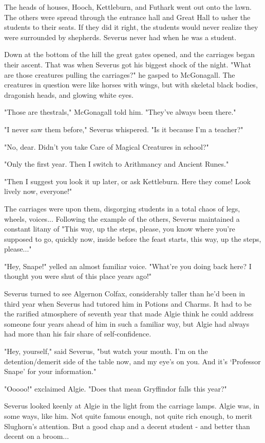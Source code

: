\documentclass[a4paper,11pt]{article}
\begin{document}
The heads of houses, Hooch, Kettleburn, and Futhark went out onto the lawn. The others were spread through the entrance hall and Great Hall to usher the students to their seats. If they did it right, the students would never realize they were surrounded by shepherds. Severus never had when he was a student.

Down at the bottom of the hill the great gates opened, and the carriages began their ascent. That was when Severus got his biggest shock of the night. "What are those creatures pulling the carriages?" he gasped to McGonagall. The creatures in question were like horses with wings, but with skeletal black bodies, dragonish heads, and glowing white eyes.

"Those are thestrals," McGonagall told him. "They've always been there."

"I never saw them before," Severus whispered. "Is it because I'm a teacher?"

"No, dear. Didn't you take Care of Magical Creatures in school?"

"Only the first year. Then I switch to Arithmancy and Ancient Runes."

"Then I suggest you look it up later, or ask Kettleburn. Here they come! Look lively now, everyone!"

The carriages were upon them, disgorging students in a total chaos of legs, wheels, voices... Following the example of the others, Severus maintained a constant litany of "This way, up the steps, please, you know where you're supposed to go, quickly now, inside before the feast starts, this way, up the steps, please..."

"Hey, Snape!" yelled an almost familiar voice. "What're you doing back here? I thought you were shut of this place years ago!"

Severus turned to see Algernon Colfax, considerably taller than he'd been in third year when Severus had tutored him in Potions and Charms. It had to be the rarified atmosphere of seventh year that made Algie think he could address someone four years ahead of him in such a familiar way, but Algie had always had more than his fair share of self-confidence.

"Hey, yourself," said Severus, "but watch your mouth. I'm on the detention/demerit side of the table now, and my eye's on you. And it's `Professor Snape' for your information."

"Ooooo!" exclaimed Algie. "Does that mean Gryffindor falls this year?"

Severus looked keenly at Algie in the light from the carriage lamps. Algie was, in some ways, like him. Not quite famous enough, not quite rich enough, to merit Slughorn's attention. But a good chap and a decent student - and better than decent on a broom...
\end{document}
